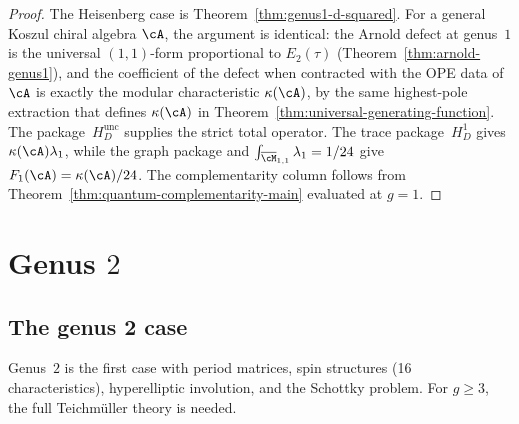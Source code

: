 \begin{proof}
The Heisenberg case is Theorem~\ref{thm:genus1-d-squared}.
For a general Koszul chiral algebra $\cA$, the argument is identical:
the Arnold defect at genus~$1$ is the universal $(1,1)$-form
proportional to $E_2(\tau)$ (Theorem~\ref{thm:arnold-genus1}),
and the coefficient of the defect when contracted with the OPE data
of $\cA$ is exactly the modular characteristic $\kappa(\cA)$,
by the same highest-pole extraction that defines $\kappa(\cA)$ in
Theorem~\ref{thm:universal-generating-function}.
The package~$H_D^{\mathrm{unc}}$ supplies the strict total operator.
The trace package~$H_D^1$ gives $\kappa(\cA)\lambda_1$, while the
graph package and
$\int_{\overline{\cM}_{1,1}}\lambda_1=1/24$
give $F_1(\cA)=\kappa(\cA)/24$.
The complementarity column follows from Theorem~\ref{thm:quantum-complementarity-main}
evaluated at $g=1$.
\end{proof}

\section{\texorpdfstring{Genus $2$}{Genus 2}}
\label{sec:genus-2-complete}

\subsection{The genus 2 case}

\begin{remark}
\label{rem:genus2-special}
Genus~$2$ is the first case with period matrices, spin structures
(16 characteristics), hyperelliptic involution, and the Schottky
problem. For $g\geq 3$, the full Teichm\"uller theory is needed.
\end{remark}

